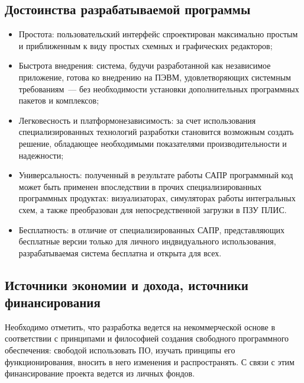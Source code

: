 \subsection{Достоинства разрабатываемой программы}
\begin{itemize}
  \item Простота: пользовательский интерфейс спроектирован максимально простым и приближенным к виду простых схемных и графических редакторов;
  \item Быстрота внедрения: система, будучи разработанной как независимое приложение, готова ко внедрению на ПЭВМ, удовлетворяющих системным требованиям~--- без необходимости установки дополнительных программных пакетов и комплексов;
  \item Легковесность и платформонезависимость: за счет использования специализированных технологий разработки становится возможным создать решение, обладающее необходимыми показателями производительности и надежности;
  \item Универсальность: полученный в результате работы САПР программный код может быть применен впоследствии в прочих специализированных программных продуктах: визуализаторах, симуляторах работы интегральных схем, а также преобразован для непосредственной загрузки в ПЗУ ПЛИС.
  \item Бесплатность: в отличие от специализированных САПР, представляющих бесплатные версии только для личного индвидуального использования, разрабатываемая система бесплатна и открыта для всех.
\end{itemize}

\subsection{Источники экономии и дохода, источники финансирования}

Необходимо отметить, что разработка ведется на некоммерческой основе в соответствии с принципами и философией создания свободного программного обеспечения: свободой использовать ПО, изучать принципы его функционирования, вносить в него изменения и распространять.
С связи с этим финансирование проекта ведется из личных фондов.

